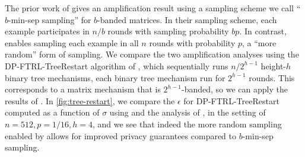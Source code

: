 The prior work of \cite{BandedMF} gives an amplification result using a sampling scheme we call ``$b$-min-sep sampling'' for  $b$-banded matrices. In their sampling scheme, each example participates in $n/b$ rounds with sampling probability $bp$. In contrast, \MMCC{} enables sampling each example in all $n$ rounds with probability $p$, a ``more random'' form of sampling. We compare the two amplification analyses using the DP-FTRL-TreeRestart algorithm of \cite{kairouz2021practical}, which sequentially runs $n/2^{h-1}$ height-$h$ binary tree mechanisms, each binary tree mechanism run for $2^{h-1}$ rounds. This corresponds to a matrix mechanism that is $2^{h-1}$-banded, so we can apply the results of \cite{BandedMF}.
In \cref{fig:tree-restart}, we compare the $\epsilon$ for DP-FTRL-TreeRestart computed as a function of $\sigma$ using \MMCC{} and the analysis of \cite{BandedMF}, in the setting of $n = 512, p = 1/16, h = 4$, and we see that indeed the more random sampling enabled by \MMCC{} allows for improved privacy guarantees compared to $b$-min-sep sampling.